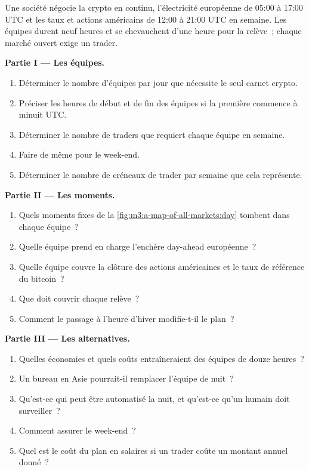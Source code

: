 \begin{problem}\label{pb:m3:a-map-of-all-markets:1}
Une société négocie la crypto en continu, l'électricité européenne de 05:00 à 17:00 UTC et les taux et actions américains de 12:00 à 21:00 UTC en semaine. Les équipes durent neuf
heures et se chevauchent d'une heure pour la relève~; chaque marché ouvert exige un trader.

\medskip\noindent\textbf{Partie I --- Les équipes.}
\begin{enumerate}
\item Déterminer le nombre d'équipes par jour que nécessite le seul carnet crypto.
\item Préciser les heures de début et de fin des équipes si la première commence à minuit UTC.
\item Déterminer le nombre de traders que requiert chaque équipe en semaine.
\item Faire de même pour le week-end.
\item Déterminer le nombre de créneaux de trader par semaine que cela représente.
\end{enumerate}

\medskip\noindent\textbf{Partie II --- Les moments.}
\begin{enumerate}[resume]
\item Quels moments fixes de la \cref{fig:m3:a-map-of-all-markets:day} tombent dans chaque équipe~?
\item Quelle équipe prend en charge l'enchère day-ahead européenne~?
\item Quelle équipe couvre la clôture des actions américaines et le taux de référence du bitcoin~?
\item Que doit couvrir chaque relève~?
\item Comment le passage à l'heure d'hiver modifie-t-il le plan~?
\end{enumerate}

\medskip\noindent\textbf{Partie III --- Les alternatives.}
\begin{enumerate}[resume]
\item Quelles économies et quels coûts entraîneraient des équipes de douze heures~?
\item Un bureau en Asie pourrait-il remplacer l'équipe de nuit~?
\item Qu'est-ce qui peut être automatisé la nuit, et qu'est-ce qu'un humain doit surveiller~?
\item Comment assurer le week-end~?
\item Quel est le coût du plan en salaires si un trader coûte un montant annuel donné~?
\end{enumerate}


\end{problem}
